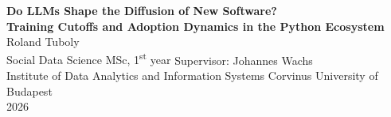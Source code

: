 \documentclass[12pt, a4paper]{report}
\begin{document}
\hypersetup{pageanchor=false}  %

\begin{titlepage}
\centering
\vspace*{2cm}
{\fontsize{14}{18}\selectfont
\textbf{Do LLMs Shape the Diffusion of New Software?}\\[6pt]
\textbf{Training Cutoffs and Adoption Dynamics in the Python Ecosystem}
}
\vfill
{\fontsize{14}{18}\selectfont
Roland Tuboly\\[6pt]
Social Data Science MSc, 1\textsuperscript{st} year
}
\vfill
{\fontsize{14}{18}\selectfont
Supervisor: Johannes Wachs\\[6pt]
Institute of Data Analytics and Information Systems
}
\vfill
{\fontsize{14}{18}\selectfont
Corvinus University of Budapest\\[6pt]
2026
}
\vspace*{2cm}
\end{titlepage}
\end{document}
